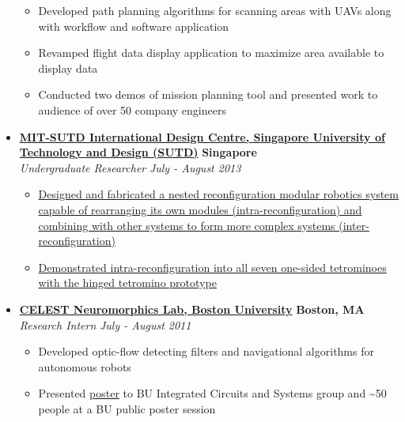 \documentclass[10pt,letterpaper]{article}
\begin{document}
\begin{itemize}
	\begin{itemize}[label=\textbullet]
	\itemsep0em
	\item Developed path planning algorithms for scanning areas with UAVs along with workflow and software application
	\item Revamped flight data display application to maximize area available to display data
	\item Conducted two demos of mission planning tool and presented work to audience of over 50 company engineers

\end{itemize}

    \item[]
    {\href{http://www.sutd.edu.sg/idc.aspx}{\textbf{MIT-SUTD International Design Centre, Singapore University of Technology and Design (SUTD)}} \hfill
      \textbf{Singapore}}
    \\
    {\emph{Undergraduate Researcher} \hfill \emph{July - August 2013}}
	
	\begin{itemize}[label=\textbullet]
	\itemsep0em
	\item {\href{http://vincentkee.wordpress.com/tetromino/}{Designed and fabricated a nested reconfiguration modular robotics system capable of rearranging its own modules (intra-reconfiguration) and combining with other systems to form more complex systems (inter-reconfiguration)}}
	\item {\href{http://www.youtube.com/watch?v=YFhAlsQ3uYQ}{Demonstrated intra-reconfiguration into all seven one-sided tetrominoes with the hinged tetromino prototype}}

\end{itemize}


    \item[]
    {\href{http://nl.bu.edu/}{\textbf{CELEST Neuromorphics Lab, Boston University}} \hfill
      \textbf{Boston, MA}}
    \\
    {\emph{Research Intern} \hfill \emph{July - August 2011}}
	
	\begin{itemize}[label=\textbullet]
	\itemsep0em
	\item Developed optic-flow detecting filters and navigational algorithms for autonomous robots
	\item Presented \href{http://vincentkee.files.wordpress.com/2011/09/optic-flow-based-navigation-using-correlation-techniques.png}{poster} to BU Integrated Circuits and Systems group and \textasciitilde 50 people at a BU public poster session
	\end{itemize}
\end{itemize}
\end{document}
